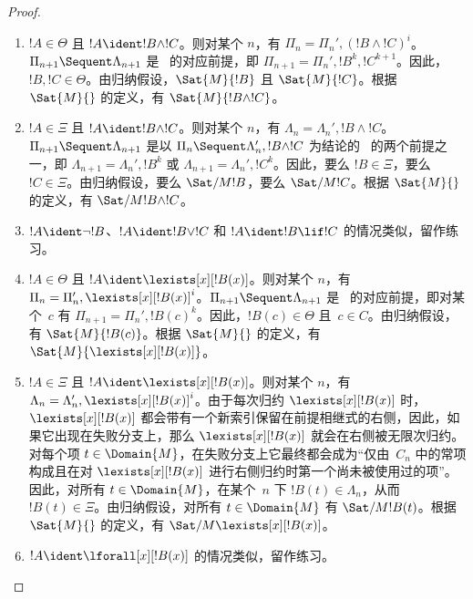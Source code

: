 \documentclass[../../../include/open-logic-section]{subfiles}
\begin{document}
\begin{proof}
\begin{enumerate}
  \item $!A \in \Theta$ 且 $!A \ident !B \land !C$。则对某个 $n$，有 $\Pi_n = \Pi_n', (!B \land !C)^i$。$\Pi_{n+1} \Sequent
  \Lambda_{n+1}$ 是~\LeftR{\land} 的对应前提，即 $\Pi_{n+1} = \Pi_n', !B^k, !C^{k+1}$。因此，$!B, !C \in \Theta$。由归纳假设，$\Sat{M}{!B}$ 且 $\Sat{M}{!C}$。根据 $\Sat{M}{}$ 的定义，有 $\Sat{M}{!B \land !C}$。

  \item $!A \in \Xi$ 且 $!A \ident !B \land !C$。则对某个 $n$，有 $\Lambda_n = \Lambda_n', !B \land !C$。$\Pi_{n+1} \Sequent
  \Lambda_{n+1}$ 是以 $\Pi_n \Sequent \Lambda'_n, !B \land !C$ 为结论的~\RightR{\land} 的两个前提之一，即 $\Lambda_{n+1} = \Lambda_n', !B^k$ 或 $\Lambda_{n+1} = \Lambda_n',
  !C^k$。因此，要么 $!B \in \Xi$，要么 $!C \in \Xi$。由归纳假设，要么 $\Sat/{M}{!B}$，要么 $\Sat/{M}{!C}$。根据 $\Sat{M}{}$ 的定义，有 $\Sat/{M}{!B \land !C}$。

  \item $!A \ident \lnot !B$、$!A \ident !B \lor !C$ 和 $!A \ident !B \lif !C$ 的情况类似，留作练习。

  \item $!A \in \Theta$ 且 $!A \ident \lexists[x][!B(x)]$。则对某个 $n$，有 $\Pi_n = \Pi_n', \lexists[x][!B(x)]^i$。$\Pi_{n+1}
  \Sequent \Lambda_{n+1}$ 是~\LeftR{\lexists} 的对应前提，即对某个~$c$ 有 $\Pi_{n+1} = \Pi_n', !B(c)^k$。因此，$!B(c) \in \Theta$ 且~$c \in C$。由归纳假设，有 $\Sat{M}{!B(c)}$。根据 $\Sat{M}{}$ 的定义，有 $\Sat{M}{\lexists[x][!B(x)]}$。

  \item $!A \in \Xi$ 且 $!A \ident \lexists[x][!B(x)]$。则对某个 $n$，有 $\Lambda_n = \Lambda_n', \lexists[x][!B(x)]^i$。由于每次归约 $\lexists[x][!B(x)]$ 时，$\lexists[x][!B(x)]$ 都会带有一个新索引保留在前提相继式的右侧，因此，如果它出现在失败分支上，那么 $\lexists[x][!B(x)]$ 就会在右侧被无限次归约。对每个项 $t \in \Domain{M}$，在失败分支上它最终都会成为“仅由~$C_n$ 中的常项构成且在对 $\lexists[x][!B(x)]$ 进行右侧归约时第一个尚未被使用过的项”。因此，对所有 $t \in \Domain{M}$，在某个~$n$ 下 $!B(t) \in \Lambda_n$，从而 $!B(t) \in \Xi$。由归纳假设，对所有 $t \in \Domain{M}$ 有 $\Sat/{M}{!B(t)}$。根据 $\Sat{M}{}$ 的定义，有 $\Sat/{M}{\lexists[x][!B(x)]}$。

  \item $!A \ident \lforall[x][!B(x)]$ 的情况类似，留作练习。
\end{enumerate}
\end{proof}
\end{document}
